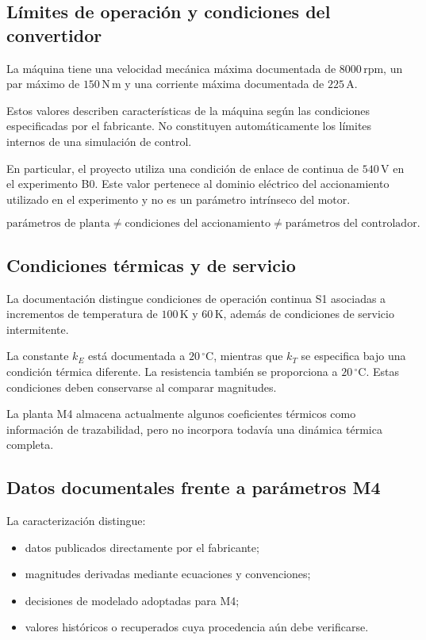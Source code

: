 \subsection{Límites de operación y condiciones del convertidor}

La máquina tiene una velocidad mecánica máxima documentada de $8000\,\mathrm{rpm}$, un par máximo de $150\,\mathrm{N\,m}$ y una corriente máxima documentada de $225\,\mathrm{A}$.

Estos valores describen características de la máquina según las condiciones especificadas por el fabricante. No constituyen automáticamente los límites internos de una simulación de control.

En particular, el proyecto utiliza una condición de enlace de continua de $540\,\mathrm{V}$ en el experimento B0. Este valor pertenece al dominio eléctrico del accionamiento utilizado en el experimento y no es un parámetro intrínseco del motor.

\begin{equation}
\text{parámetros de planta}
\neq
\text{condiciones del accionamiento}
\neq
\text{parámetros del controlador}.
\end{equation}

\subsection{Condiciones térmicas y de servicio}

La documentación distingue condiciones de operación continua S1 asociadas a incrementos de temperatura de $100\,\mathrm{K}$ y $60\,\mathrm{K}$, además de condiciones de servicio intermitente.

La constante $k_E$ está documentada a $20\,^{\circ}\mathrm{C}$, mientras que $k_T$ se especifica bajo una condición térmica diferente. La resistencia también se proporciona a $20\,^{\circ}\mathrm{C}$. Estas condiciones deben conservarse al comparar magnitudes.

La planta M4 almacena actualmente algunos coeficientes térmicos como información de trazabilidad, pero no incorpora todavía una dinámica térmica completa.

\subsection{Datos documentales frente a parámetros M4}

La caracterización distingue:

\begin{itemize}
    \item datos publicados directamente por el fabricante;
    \item magnitudes derivadas mediante ecuaciones y convenciones;
    \item decisiones de modelado adoptadas para M4;
    \item valores históricos o recuperados cuya procedencia aún debe verificarse.
\end{itemize}

